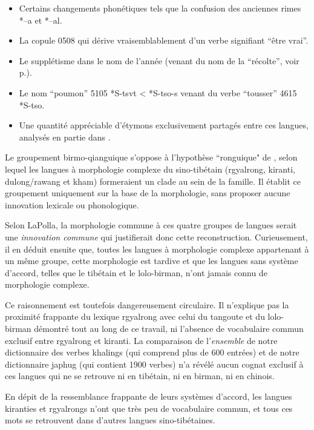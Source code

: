 \documentclass[oldfontcommands,twoside,a4paper,11pt,draft]{memoir}
\newcommand{\tgz}[1]{#1 \mo{#1} \tg{#1}}
\begin{document}
\begin{itemize}
\item Certains changements phonétiques tels que la confusion des anciennes rimes *--a et *--al.
\item  La copule \tgz{0508} qui dérive vraisemblablement d'un verbe signifiant ``être vrai''.
\item Le supplétisme dans le nom de l'année (venant du nom de la ``récolte'', voir p.\pageref{tab:suppletisme:annee}).


\item Le nom ``poumon'' \tgz{5105} *S-tsvt < *S-tso-s venant du verbe ``tousser'' \tgz{4615} *S-tso. 

\item Une quantité appréciable d'étymons exclusivement partagés entre ces langues, analysés en partie dans \citet{jacques.michaud11naish}.

\end{itemize}

Le groupement birmo-qianguique s'oppose à l'hypothèse ``ronguique" de \citet{lapolla03}, selon lequel les langues à morphologie complexe du sino-tibétain (rgyalrong, kiranti, dulong/rawang et kham) formeraient un clade au sein de la famille. Il établit ce groupement uniquement sur la base de la morphologie, sans proposer aucune innovation lexicale ou phonologique.


Selon LaPolla, la morphologie commune à ces quatre groupes de langues serait une \textit{innovation commune} qui justifierait donc cette reconstruction. Curieusement, il en déduit ensuite que, toutes les langues à morphologie complexe appartenant à un même groupe, cette morphologie est tardive et que les langues sans système d'accord, telles que le tibétain et le lolo-birman, n'ont jamais connu de morphologie complexe. 

Ce raisonnement est toutefois dangereusement circulaire. Il n'explique pas la proximité frappante du lexique rgyalrong avec celui du tangoute et du lolo-birman démontré tout au long de ce travail, ni l'absence de vocabulaire commun exclusif entre rgyalrong et kiranti. La comparaison de l'\textit{ensemble} de notre dictionnaire des verbes khalings (qui comprend plus de 600 entrées) et de notre dictionnaire japhug (qui contient 1900 verbes) n'a révélé aucun cognat exclusif à ces langues qui ne se retrouve ni en tibétain, ni en birman, ni en chinois. 

En dépit de la ressemblance frappante de leurs systèmes d'accord, les langues kiranties et rgyalrongs n'ont que très peu de vocabulaire commun, et tous ces mots se retrouvent dans d'autres langues sino-tibétaines. 
\end{document}
